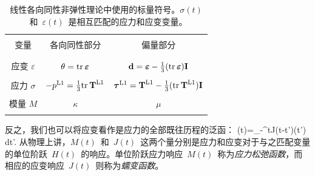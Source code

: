 \begin{table}
\centering
\begin{tabular}{|c|c|c|} \hline
&& \\
变量 & 各向同性部分 & 偏量部分 \\
&& \\ \hline
&& \\
应变 $\varepsilon$ & $\theta={\rm tr}_{\,}\mbox{\boldmath $\bf \varepsilon$}$
& $\mbox{${\bf d}$}=\mbox{\boldmath $\bf \varepsilon$}-\mbox{$\frac{1}{3}$}({\rm tr}_{\,}\mbox{\boldmath $\bf \varepsilon$})\mbox{${\bf I}$}$ \\
&& \\
应力 $\sigma$ & $-p^{\rm L1}=\mbox{$\frac{1}{3}$}{\rm tr}_{\,}\mbox{${\bf T}$}^{\rm L1}$
& $\mbox{\boldmath $\bf \tau$}^{\rm L1}=\mbox{${\bf T}$}^{\rm L1}-\mbox{$\frac{1}{3}$}({\rm tr}_{\,}\mbox{${\bf T}$}^{\rm L1})\mbox{${\bf I}$}$ \\
&& \\
模量 $M$ & $\kappa$ & $\mu$ \\
&& \\ \hline
\end{tabular}
\caption[M&Jdefns]{
线性各向同性非弹性理论中使用的标量符号。$\sigma(t)$~和~$\varepsilon(t)$~是相互匹配的应力和应变变量。
}
\end{table}

反之，我们也可以将应变看作是应力的全部既往历程的泛函：
\eq
\label{6.Boltzmann5}
\varepsilon(t)=\int_{-\infty}^tJ(t-t')\dot{\sigma}(t')\,dt'.
\en
从物理上讲，$M(t)$~和~$J(t)$~这两个量分别是应力和应变对于与之匹配变量的单位阶跃~$H(t)$~的响应。单位阶跃应力响应~$M(t)$~称为{\em 应力松弛函数\/}，而相应的应变响应~$J(t)$~则称为{\em 蠕变函数\/}。

